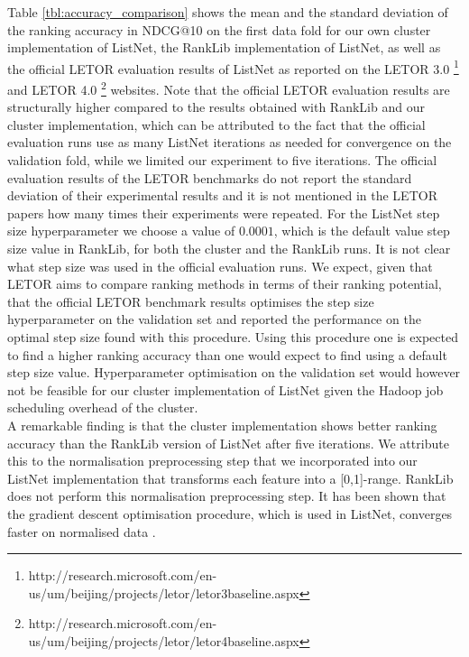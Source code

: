 Table \ref{tbl:accuracy_comparison} shows the mean and the standard deviation of the ranking accuracy in \ac{NDCG}@10 on the first data fold for our own cluster implementation of ListNet, the RankLib implementation of ListNet, as well as the official LETOR evaluation results of ListNet as reported on the LETOR 3.0 \footnote{http://research.microsoft.com/en-us/um/beijing/projects/letor/letor3baseline.aspx} and LETOR 4.0 \footnote{http://research.microsoft.com/en-us/um/beijing/projects/letor/letor4baseline.aspx} websites. Note that the official LETOR evaluation results are structurally higher compared to the results obtained with RankLib and our cluster implementation, which can be attributed to the fact that the official evaluation runs use as many ListNet iterations as needed for convergence on the validation fold, while we limited our experiment to five iterations. The official evaluation results of the LETOR benchmarks do not report the standard deviation of their experimental results and it is not mentioned in the LETOR papers \cite{Qin2010, Qin2013} how many times their experiments were repeated. For the ListNet step size hyperparameter we choose a value of $0.0001$, which is the default value step size value in RankLib, for both the cluster and the RankLib runs. It is not clear what step size was used in the official evaluation runs. We expect, given that LETOR aims to compare ranking methods in terms of their ranking potential, that the official LETOR benchmark results optimises the step size hyperparameter on the validation set and reported the performance on the optimal step size found with this procedure. Using this procedure one is expected to find a higher ranking accuracy than one would expect to find using a default step size value. Hyperparameter optimisation on the validation set would however not be feasible for our cluster implementation of ListNet given the Hadoop job scheduling overhead of the cluster.\\

A remarkable finding is that the cluster implementation shows better ranking accuracy than the RankLib version of ListNet after five iterations. We attribute this to the normalisation preprocessing step that we incorporated into our ListNet implementation that transforms each feature into a [0,1]-range. RankLib does not perform this normalisation preprocessing step. It has been shown that the gradient descent optimisation procedure, which is used in ListNet, converges faster on normalised data \cite{Ng1999}.

